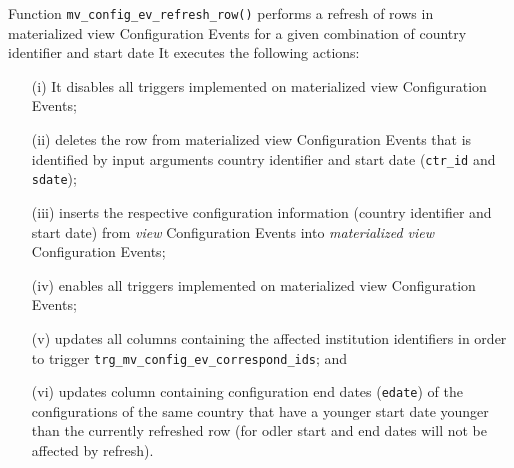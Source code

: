Function \texttt{mv\_config\_ev\_refresh\_row()} performs a refresh of rows in materialized view Configuration Events for a given combination of country identifier and start date
% 
% 
% 
%   
It executes the following actions:
\begin{itemize}
\item[(i)]{It disables all triggers implemented on materialized view Configuration Events;}
\item[(ii)]{deletes the row from materialized view Configuration Events that is identified by input arguments country identifier and start date (\texttt{ctr\_id} and \texttt{sdate});}
\item[(iii)]{inserts the respective configuration information (country identifier and start date) from {\em view} Configuration Events into {\em materialized view} Configuration Events;}
\item[(iv)]{enables all triggers implemented on materialized view Configuration Events;}
\item[(v)]{updates all columns containing the affected institution identifiers in order to trigger \texttt{trg\_mv\_config\_ev\_correspond\_ids}; and}
\item[(vi)]{updates column containing configuration end dates (\texttt{edate}) of the configurations of the same country that have a younger start date younger than the currently refreshed row (for odler start and end dates will not be affected by refresh).}
\end{itemize}


